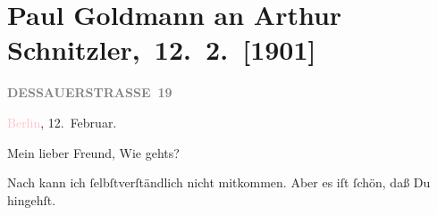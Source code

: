 

\renewcommand{\erwaehntePersonen}{Personen: Richard Beer-Hofmann, Gabriel Beer-Hofmann, Eduard Douwes Dekker, Marie Glümer, Louise Schnitzler, Olga Schnitzler, Elisabeth Steinrück, Ida d’Albert}
\renewcommand{\erwaehnteInstitutionen}{Institutionen: Breslauer Zeitung}
\renewcommand{\erwaehnteOrte}{Orte: Berlin, Bologna, Dessauer Straße, Florenz, Genua, Griechenland, Italien, Niederlande, Pisa, Rom, Rotensterngasse, Ungarn, Wien}
\renewcommand{\erwaehnteWerke}{Werke: Arbeiter-Zeitung, Tagebuch, Tagesneuigkeiten. Richtig}
\section[ Paul Goldmann an Arthur Schnitzler, 12. 2. {[}1901{]}]{Paul Goldmann an Arthur Schnitzler, 12. 2. {[}1901{]}}
\nopagebreak{}
\rehead{ }\normalsize\beginnumbering{}
\toendnotes[C]{\smallbreak\pagebreak[2]}
\toendnotes[C]{\smallbreak}
\pstart
           \noindent{}\raggedleft{}{\pb}\textcolor{pink}{\textcolor{gray}{\textbf{DESSAUERSTRASSE 19}}}{}\ledrightnote{\textcolor{pink}{Dessauer Straße}}\pend
           
\pstart
           \textcolor{pink}{Berlin}{}\ledrightnote{\textcolor{pink}{Berlin}}, 12. Februar.\pend
           
\pstart\center{}Mein lieber Freund,\pend
\pstart
           Wie gehts?\pend
           
\pstart
           Nach \label{K_L03057-1v}\label{K_L03057-1h} kann ich ſelbſtverſtändlich
               nicht mitkommen. Aber es iſt ſchön, daß Du hingehſt.\pend
           
